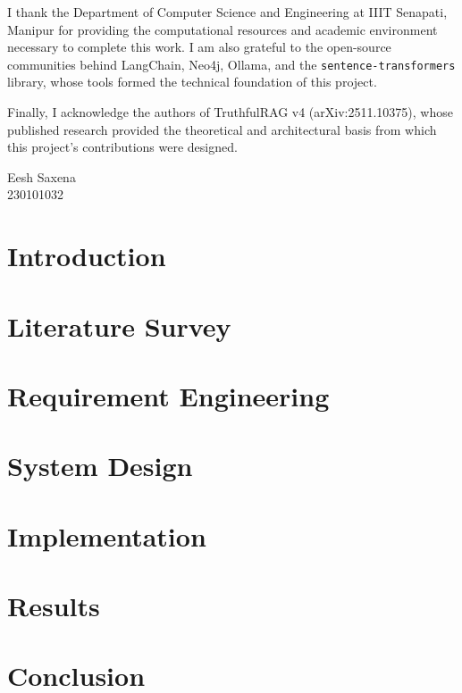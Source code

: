 \documentclass[a4paper, 11pt, oneside]{report}
\begin{document}
I thank the Department of Computer Science and Engineering at IIIT Senapati,
Manipur for providing the computational resources and academic environment
necessary to complete this work. I am also grateful to the open-source
communities behind LangChain, Neo4j, Ollama, and the
\texttt{sentence-transformers} library, whose tools formed the technical
foundation of this project.

Finally, I acknowledge the authors of TruthfulRAG v4 (arXiv:2511.10375), whose
published research provided the theoretical and architectural basis from which
this project's contributions were designed.

\vspace{1cm}
\begin{flushright}
Eesh Saxena\\
230101032
\end{flushright}

\tableofcontents
\listoffigures
\listoftables

\chapter{Introduction}


\chapter{Literature Survey}


\chapter{Requirement Engineering}


\chapter{System Design}


\chapter{Implementation}


\chapter{Results}
\label{ch:results}


\chapter{Conclusion}




\end{document}
